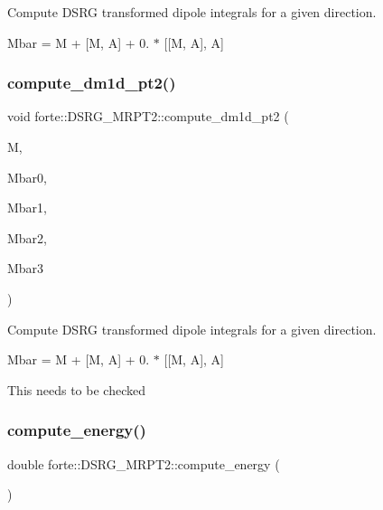 Compute D\+S\+RG transformed dipole integrals for a given direction. 

Mbar = M + \mbox{[}M, A\mbox{]} + 0. $\ast$ \mbox{[}\mbox{[}M, A\mbox{]}, A\mbox{]} \mbox{\label{classforte_1_1_d_s_r_g___m_r_p_t2_a5f75a8701631f236a25b0455a0cc692b}} 
\subsubsection{\texorpdfstring{compute\+\_\+dm1d\+\_\+pt2()}{compute\_dm1d\_pt2()}\hspace{0.1cm}{\footnotesize\ttfamily [2/2]}}
{\footnotesize\ttfamily void forte\+::\+D\+S\+R\+G\+\_\+\+M\+R\+P\+T2\+::compute\+\_\+dm1d\+\_\+pt2 (\begin{DoxyParamCaption}\item[{Blocked\+Tensor \&}]{M,  }\item[{double \&}]{Mbar0,  }\item[{Blocked\+Tensor \&}]{Mbar1,  }\item[{Blocked\+Tensor \&}]{Mbar2,  }\item[{Blocked\+Tensor \&}]{Mbar3 }\end{DoxyParamCaption})\hspace{0.3cm}{\ttfamily [protected]}}



Compute D\+S\+RG transformed dipole integrals for a given direction. 

Mbar = M + \mbox{[}M, A\mbox{]} + 0. $\ast$ \mbox{[}\mbox{[}M, A\mbox{]}, A\mbox{]}

This needs to be checked \mbox{\label{classforte_1_1_d_s_r_g___m_r_p_t2_a0884f1a9e8f98eb3c272e9c6518e7691}} 
\subsubsection{\texorpdfstring{compute\+\_\+energy()}{compute\_energy()}}
{\footnotesize\ttfamily double forte\+::\+D\+S\+R\+G\+\_\+\+M\+R\+P\+T2\+::compute\+\_\+energy (\begin{DoxyParamCaption}{ }\end{DoxyParamCaption})\hspace{0.3cm}{\ttfamily [virtual]}}



